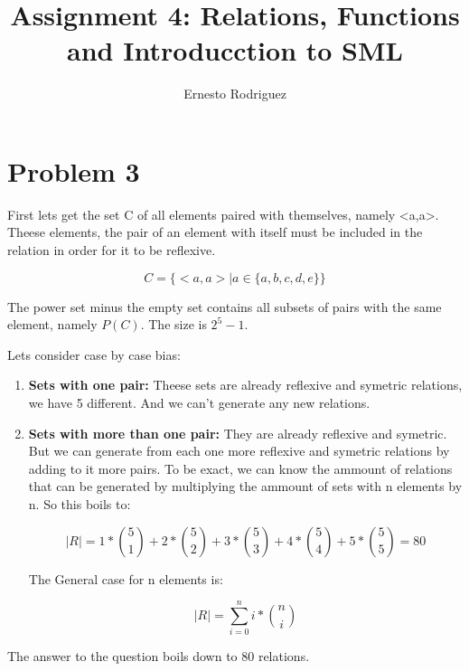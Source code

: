 \documentclass{article}
\title{Assignment 4: Relations, Functions and Introducction to SML}
\author{Ernesto Rodriguez}
\begin{document}
\maketitle

\section{Problem 3}

First lets get the set C of all elements paired with themselves, namely <a,a>. Theese elements, the pair of an element with itself must be included in the relation in order for it to be reflexive.

\[
C=\{<a,a> | a \in \{a,b,c,d,e\}\}
\]

The power set minus the empty set contains all subsets of pairs with the same element, namely $P(C)$. The size is $2^5-1$. 

Lets consider case by case bias:

\begin{enumerate}

  \item{{\bf Sets with one pair: }Theese sets are already reflexive and symetric relations, we have 5 different. And we can't generate any new relations.}
  \item{{\bf Sets with more than one pair: }They are already reflexive and symetric. But we can generate from each one more reflexive and symetric relations by adding to it more pairs. To be exact, we can know the ammount of relations that can be generated by multiplying the ammount of sets with n elements by n. So this boils to:

    \[
    |R|=1*\binom{5}{1}+2*\binom{5}{2}+3*\binom{5}{3}+4*\binom{5}{4}+5*\binom{5}{5}=80
    \]

    The General case for n elements is:

    \[
    |R|=\sum_{i=0}^n i*\binom{n}{i}
    \]
    }
\end{enumerate}

    The answer to the question boils down to 80 relations.
\end{document}
